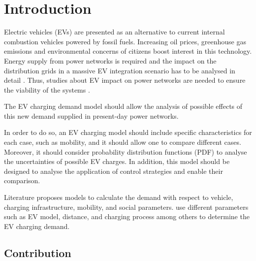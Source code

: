 \documentclass[a4paper,11pt,twoside,openright]{report}
\begin{document}
\section{Introduction}

Electric vehicles (EVs) are presented as an alternative to current internal combustion vehicles powered by fossil fuels. Increasing oil prices, greenhouse gas emissions and environmental concerns of citizens boost interest in this technology. Energy supply from power networks is required and the impact on the distribution grids in a massive EV integration scenario has to be analysed in detail \cite{MIT_Grid}. Thus, studies about EV impact on power networks are needed to ensure the viability of the systems \cite{Clement2010,Sikai2010,EPE_Surtidor}.

The EV charging demand model should allow the analysis of possible effects of this new demand supplied in present-day power networks.

In order to do so, an EV charging model should include specific characteristics for each case, such as mobility, and it should allow one to compare different cases. Moreover, it should consider probability distribution functions (PDF) to analyse the uncertainties of possible EV charges. %
In addition, this model should be designed to analyse the application of control strategies and enable their comparison.

Literature proposes models to calculate the demand with respect to vehicle, charging infrastructure, mobility, and social parameters. \cite{Watts-Transp,Soares2012,Acha79,Valsera2012,Soares2011} use different parameters such as EV model, distance, and charging process among others to determine the EV charging demand.



\subsection{Contribution} \label{sec:contribution}
\end{document}
